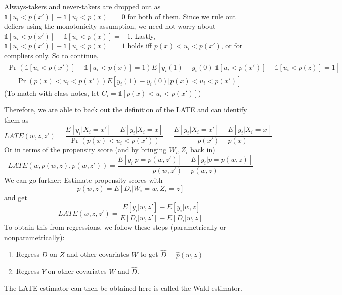 \documentclass[12pt]{article}
\theoremstyle{definition}
\theoremstyle{property}
\theoremstyle{assumption}
\theoremstyle{example}
\theoremstyle{comment}
\begin{document}
Always-takers and never-takers are dropped out as $\mathbb{1}[u_i<p(x')]-\mathbb{1}[u_i<p(x)]=0$ for both of them.  Since we rule out defiers using the monotonicity assumption, we need not worry about $\mathbb{1}[u_i<p(x')]-\mathbb{1}[u_i<p(x)]=-1$. Lastly, $\mathbb{1}[u_i<p(x')]-\mathbb{1}[u_i<p(x)]=1$ holds iff $p(x)<u_i<p(x')$, or for compliers only. So to continue,
 \small{\begin{gather*}
\Pr(\mathbb{1}[u_i<p(x')]-\mathbb{1}[u_i<p(x)]=1)E[y_i(1)-y_i(0)|\mathbb{1}[u_i<p(x')]-\mathbb{1}[u_i<p(z)]=1]\\
=\Pr(p(x)<u_i<p(x'))E[y_i(1)-y_i(0)|p(x)<u_i<p(x')]
\end{gather*}}\normalsize
(To match with class notes, let $C_i=\mathbb{1}[p(x)<u_i<p(x')]$) \par
Therefore, we are able to back out the definition of the LATE and can identify them as
\[
LATE(w, z, z')=\frac{E[y_i|X_i=x']-E[y_i|X_i=x]}{\Pr(p(x)<u_i<p(x'))}=\frac{E[y_i|X_i=x']-E[y_i|X_i=x]}{p(x')-p(x)}
\]
Or in terms of the propensity score (and by bringing $W_i, Z_i$ back in)
\[
LATE(w, p(w,z),p(w,z'))=\frac{E[y_i|p=p(w,z')]-E[y_i|p=p(w,z)]}{p(w,z')-p(w,z)}
\]
We can go further: Estimate propensity scores with
\[
p(w,z)=E[D_i|W_i=w, Z_i=z]
\]
and get
\[
LATE(w, z, z')=\frac{E[y_i|w, z']-E[y_i|w, z]}{E[D_i|w, z']-E[D_i|w, z]}
\]
To obtain this from regressions, we follow these steps (parametrically or nonparametrically):
\begin{enumerate}
\item Regress $D$ on $Z$ and other covariates $W$ to get $\widehat{D}=\hat{p}(w,z)$
\item Regress $Y$ on other covariates $W$ and $\widehat{D}$.
\end{enumerate}
The LATE estimator can then be obtained here is called the Wald estimator. 
\end{document}
